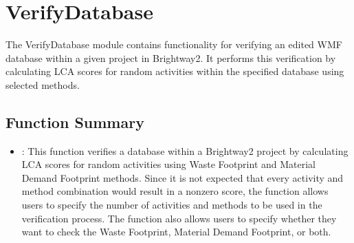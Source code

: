 \documentclass[letterpaper,10pt,english]{sphinxmanual}
\begin{document}
\sphinxstepscope


\section{VerifyDatabase}
\label{\detokenize{VerifyDatabase:verifydatabase}}\label{\detokenize{VerifyDatabase::doc}}
\sphinxAtStartPar
The VerifyDatabase module contains functionality for verifying an edited WMF database within a given project in Brightway2. It performs this verification by calculating LCA scores for random activities within the specified database using selected methods.


\subsection{Function Summary}
\label{\detokenize{VerifyDatabase:function-summary}}\begin{itemize}
\item {} 
\sphinxAtStartPar
{}: This function verifies a database within a Brightway2 project by calculating LCA scores
for random activities using Waste Footprint and Material Demand Footprint methods. Since it is not expected that every activity and method combination would result in a non\sphinxhyphen{}zero score, the function allows users to specify the number of activities and methods to be used in the verification process. The function also allows users to specify whether they want to check the Waste Footprint, Material Demand Footprint, or both.

\begin{sphinxVerbatim}[commandchars=\\\{\}]
     



\end{sphinxVerbatim}
\end{itemize}
\end{document}
